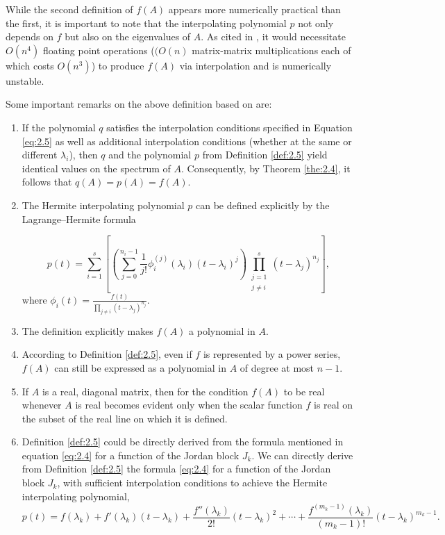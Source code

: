 While the second definition of $f(A)$ appears more numerically practical than the first, it is important to note that the interpolating polynomial $p$ not only depends on $f$ but also on the eigenvalues of $A$. As cited in \cite{15}, it would necessitate $O(n^{4} )$ floating point operations ($(O(n)$ matrix-matrix multiplications each of which costs $O(n^{3} )$) to produce $f(A)$ via interpolation and is numerically unstable.

\begin{remark}
    \label{rem:2.6}
    Some important remarks on the above definition based on \cite{8}are:
    \begin{enumerate}
    \item If the polynomial $q$ satisfies the interpolation conditions specified in Equation \eqref{eq:2.5} as well as additional interpolation conditions (whether at the same or different $\lambda_i$), then $q$ and the polynomial  $p$ from Definition \ref{def:2.5} yield identical values on the spectrum of $A$. Consequently, by Theorem \ref{the:2.4}, it follows that $q(A) = p(A) = f(A)$.

    \item The Hermite interpolating polynomial $p$ can be defined explicitly by the Lagrange–Hermite formula

    \begin{equation}
        p(t) = \sum_{i=1}^{s} \left[ \left( \sum_{j=0}^{n_{i}-1} \frac{1}{j!} \phi_{i}^{(j)}(\lambda_{i})(t-\lambda_{i})^{j} \right) \prod_{\substack{j=1 \\ j \neq i}}^{s} (t-\lambda_{j})^{n_{j}} \right],
        \label{eq:2.6}
    \end{equation}
    where  $\phi_i(t) = \frac{f(t)}{\prod_{j \neq i} (t - \lambda_j)^{n_j}}$.

    \item The definition explicitly makes $f(A)$ a polynomial in $A$.

    \item According to Definition \ref{def:2.5}, even if $f$ is represented by a power series, $f(A)$ can still be expressed as a polynomial in $A$ of degree at most $n-1$.

    \item If $A$ is a real, diagonal matrix, then for the condition  $f(A)$ to be real whenever $A$ is real becomes evident only when the scalar function $f$ is real on the subset of the real line on which it is defined.

    \item Definition \ref{def:2.5} could be directly derived from the formula mentioned in equation \eqref{eq:2.4} for a function of the Jordan block $J_k$. 
    We can directly derive from Definition \ref{def:2.5} the formula \eqref{eq:2.4} for a function of the Jordan block $J_k$, with sufficient interpolation conditions to achieve the Hermite interpolating polynomial,
    \[
        p(t) = f(\lambda_k) + f'(\lambda_k)(t - \lambda_k) + \frac{f''(\lambda_k)}{2!}(t - \lambda_k)^2 + \cdots + \frac{f^{(m_k-1)}(\lambda_k)}{(m_k-1)!}(t - \lambda_k)^{m_k-1}.
    \]

    \end{enumerate}
\end{remark}

